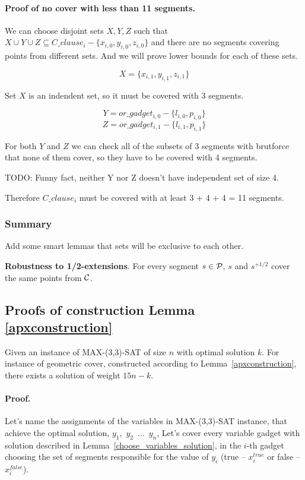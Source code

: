 \paragraph{Proof of no cover with less than 11 segments.}

We can choose disjoint sets $X, Y, Z$ such that
$X \cup Y \cup Z \subseteq C\_clause_i - \{x_{i, 0}, y_{i, 0}, z_{i, 0}\}$
and there are no segments covering points from different sets.
And we will prove lower bounds for each of these sets.

$$X = \{x_{i, 1}, y_{i, 1}, z_{i, 1}\}$$

Set $X$ is an indendent set, so it must be covered with 3 segments.

$$Y = or\_gadget_{i, 0} - \{l_{i, 0}, p_{i, 0}\}$$
$$Z = or\_gadget_{i, 1} - \{l_{i, 1}, p_{i, 1}\}$$


For both $Y$ and $Z$ we can check all of the subsets of 3 segments
with brutforce that none of them cover, so they have to be covered with
4 segments.

TODO: Funny fact, neither Y nor Z doesn't have independent set of size 4.

Therefore $C\_clause_i$ must be covered with at least 3 + 4 + 4 = 11 segments.

\subsubsection{Summary}

Add some smart lemmas that sets will be exclusive to each other.

\begin{lemma}
\textbf{Robustness to 1/2-extensions}. For every segment $s \in \mathcal{P}$,
$s$ and $s^{+1/2}$ cover the same points from $\mathcal{C}$.
\end{lemma}

\subsection{Proofs of construction Lemma \ref{apxconstruction}}
\begin{lemma}
	\label{construction_correctness}
	Given an instance of MAX-(3,3)-SAT of size $n$
	with optimal solution $k$.
	For instance of geometric cover, constructed
	according to Lemma~\ref{apxconstruction}, 
	there exists a solution of weight $15n - k$.
\end{lemma}
\paragraph{Proof.}
Let's name the assignments of the variables in MAX-(3,3)-SAT instance,
that achieve the optimal solution,
$y_1$,~$y_2$~$\ldots$~$y_n$,
Let's cover every variable gadget with solution described in
Lemma~\ref{choose_variables_solution},
in the $i$-th gadget choosing the set of segments responsible for the
value of $y_i$
(true -- $x_i^{true}$ or false -- $x_i^{false}$).

